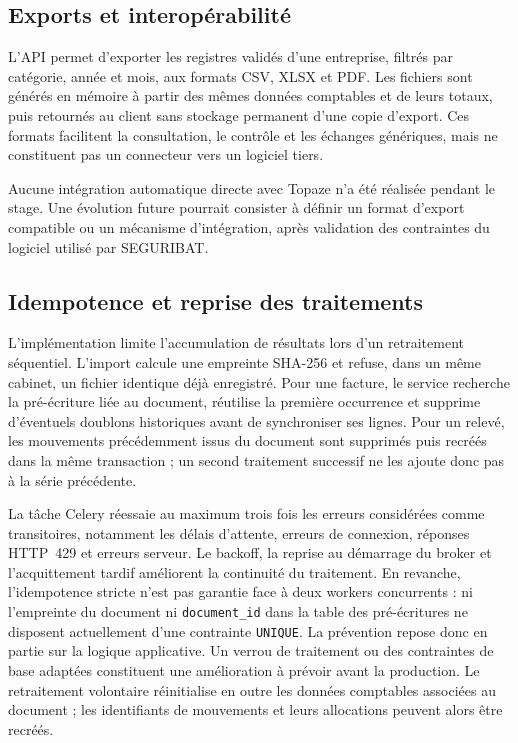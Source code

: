\documentclass[12pt,a4paper,oneside]{report}
\begin{document}
\subsection{Exports et interopérabilité}

L'API permet d'exporter les registres validés d'une entreprise, filtrés par
catégorie, année et mois, aux formats CSV, XLSX et PDF. Les fichiers sont
générés en mémoire à partir des mêmes données comptables et de leurs totaux,
puis retournés au client sans stockage permanent d'une copie d'export. Ces
formats facilitent la consultation, le contrôle et les échanges génériques,
mais ne constituent pas un connecteur vers un logiciel tiers.

Aucune intégration automatique directe avec Topaze n'a été réalisée pendant le
stage. Une évolution future pourrait consister à définir un format d'export
compatible ou un mécanisme d'intégration, après validation des contraintes du
logiciel utilisé par SEGURIBAT.

\subsection{Idempotence et reprise des traitements}

L'implémentation limite l'accumulation de résultats lors d'un retraitement
séquentiel. L'import calcule une empreinte SHA-256 et refuse, dans un même
cabinet, un fichier identique déjà enregistré. Pour une facture, le service
recherche la pré-écriture liée au document, réutilise la première occurrence et
supprime d'éventuels doublons historiques avant de synchroniser ses lignes. Pour
un relevé, les mouvements précédemment issus du document sont supprimés puis
recréés dans la même transaction ; un second traitement successif ne les ajoute
donc pas à la série précédente.

La tâche Celery réessaie au maximum trois fois les erreurs considérées comme
transitoires, notamment les délais d'attente, erreurs de connexion, réponses
HTTP~429 et erreurs serveur. Le backoff, la reprise au démarrage du broker et
l'acquittement tardif améliorent la continuité du traitement. En revanche,
l'idempotence stricte n'est pas garantie face à deux workers concurrents : ni
l'empreinte du document ni \texttt{document\_id} dans la table des
pré-écritures ne disposent actuellement d'une contrainte \texttt{UNIQUE}. La
prévention repose donc en partie sur la logique applicative. Un verrou de
traitement ou des contraintes de base adaptées constituent une amélioration à
prévoir avant la production. Le retraitement volontaire réinitialise en outre
les données comptables associées au document ; les identifiants de mouvements
et leurs allocations peuvent alors être recréés.
\end{document}
